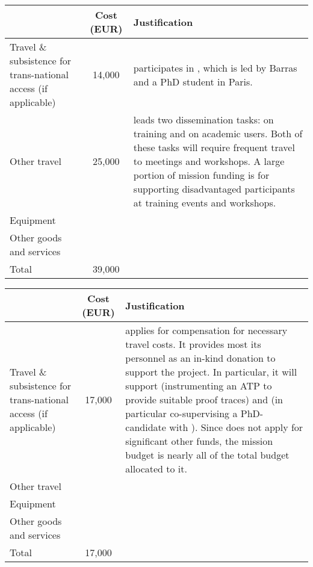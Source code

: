 \begin{longtable*}{|p{.25\textwidth}|c|p{0.55\textwidth}|}
\hline
   & Cost (EUR)  & Justification \\
  \hline
  Travel \& subsistence for trans-national access (if applicable) & 14,000 &
 participates in , which is led by Barras and a PhD student in Paris.
\\
  \hline
  Other travel & 25,000 &
 leads two dissemination tasks:
 on training and
 on academic users.
Both of these tasks will require frequent travel to meetings and workshops.
A large portion of mission funding is for supporting disadvantaged participants at training events and workshops.\\
  \hline
  Equipment & & \\
  \hline
  Other goods and services & & \\
  \hline
  Total & 39,000 & \\
  \hline
\end{longtable*}

\begin{longtable*}{|p{.25\textwidth}|c|p{0.55\textwidth}|}
\hline
   & Cost (EUR)  & Justification \\
  \hline
  Travel \& subsistence for trans-national access (if applicable) & 17,000 &
   applies for compensation for necessary travel costs. It
  provides most its personnel as an in-kind donation to support the
  project. In particular, it will support 
  (instrumenting an ATP to provide suitable proof traces) and
   (in particular co-supervising a PhD-candidate
  with ). Since  does not apply for significant other
  funds, the mission budget is nearly all of the total budget
  allocated to it.
\\
  \hline
  Other travel & & \\
  \hline
  Equipment & & \\
  \hline
  Other goods and services & & \\
  \hline
  Total & 17,000 & \\
  \hline
\end{longtable*}

